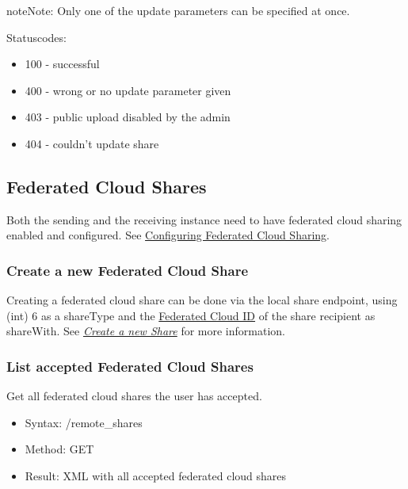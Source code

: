 \documentclass[letterpaper,10pt,english]{sphinxmanual}
\begin{document}
\begin{notice}{note}{Note:}
Only one of the update parameters can be specified at once.
\end{notice}

Statuscodes:
\begin{itemize}
\item {} 
100 - successful

\item {} 
400 - wrong or no update parameter given

\item {} 
403 - public upload disabled by the admin

\item {} 
404 - couldn't update share

\end{itemize}


\subsection{Federated Cloud Shares}
\label{core/ocs-share-api:federated-cloud-shares}
Both the sending and the receiving instance need to have federated cloud sharing
enabled and configured. See \href{https://doc.owncloud.org/server/9.0/admin\_manual/configuration\_files/federated\_cloud\_sharing\_configuration.html}{Configuring Federated Cloud Sharing}.


\subsubsection{Create a new Federated Cloud Share}
\label{core/ocs-share-api:create-a-new-federated-cloud-share}
Creating a federated cloud share can be done via the local share endpoint, using
(int) 6 as a shareType and the \href{https://owncloud.org/federation/}{Federated Cloud ID}
of the share recipient as shareWith. See {\hyperref[core/ocs\string-share\string-api:create\string-a\string-new\string-share]{\emph{Create a new Share}}} for more information.


\subsubsection{List accepted Federated Cloud Shares}
\label{core/ocs-share-api:list-accepted-federated-cloud-shares}
Get all federated cloud shares the user has accepted.
\begin{itemize}
\item {} 
Syntax: /remote\_shares

\item {} 
Method: GET

\item {} 
Result: XML with all accepted federated cloud shares

\end{itemize}
\end{document}
